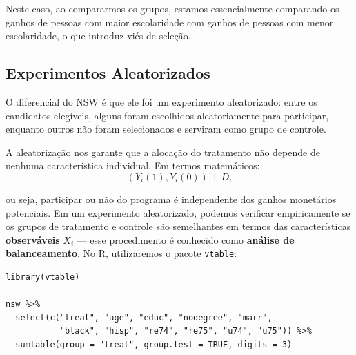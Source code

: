 \documentclass[12pt,a4paper]{article}
\begin{document}
Neste caso, ao compararmos os grupos, estamos essencialmente comparando os ganhos de pessoas com maior escolaridade com ganhos de pessoas com menor escolaridade, o que introduz viés de seleção.

\subsection{Experimentos Aleatorizados}

O diferencial do NSW é que ele foi um experimento aleatorizado: entre os candidatos elegíveis, alguns foram escolhidos aleatoriamente para participar, enquanto outros não foram selecionados e serviram como grupo de controle.

A aleatorização nos garante que a alocação do tratamento não depende de nenhuma característica individual. Em termos matemáticos:
$$(Y_i(1), Y_i(0)) \perp D_i$$

ou seja, participar ou não do programa é independente dos ganhos monetários potenciais. Em um experimento aleatorizado, podemos verificar empiricamente se os grupos de tratamento e controle são semelhantes em termos das características \textbf{observáveis} $X_i$ --- esse procedimento é conhecido como \textbf{análise de balanceamento}. No R, utilizaremos o pacote \texttt{vtable}:

\begin{lstlisting}[style=Rstyle]
library(vtable)

nsw %>%
  select(c("treat", "age", "educ", "nodegree", "marr",
           "black", "hisp", "re74", "re75", "u74", "u75")) %>%
  sumtable(group = "treat", group.test = TRUE, digits = 3)
\end{lstlisting}
\end{document}
